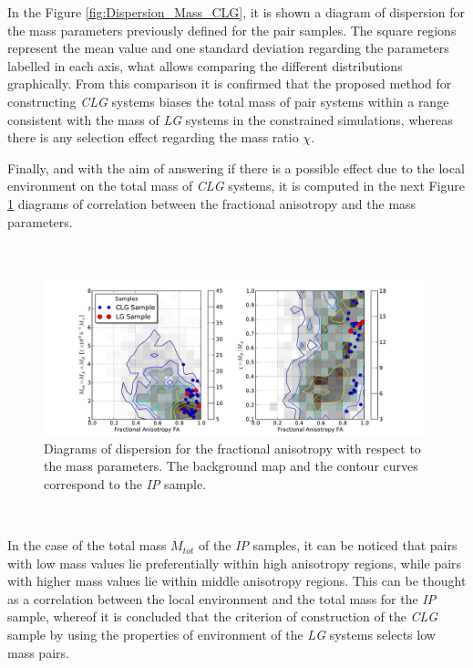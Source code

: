 In the Figure \ref{fig:Dispersion_Mass_CLG}, it is shown a diagram of 
dispersion for the mass parameters previously defined for the pair samples.
The square regions represent the mean value and one standard deviation 
regarding the parameters labelled in each axis, what allows comparing the
different distributions graphically. From this comparison it is confirmed 
that the proposed method for constructing \textit{CLG} systems biases the 
total mass of pair systems within a range consistent with the mass of 
\textit{LG} systems in the constrained simulations, whereas there is any
selection effect regarding the mass ratio $\chi$.


Finally, and with the aim of answering if there is a possible effect due
to the local environment on the total mass of \textit{CLG} systems, it is
computed in the next Figure \ref{fig:CLG_FA_Mass} diagrams of correlation
between the fractional anisotropy and the mass parameters.


\
\begin{figure}[htbp]
	\centering
	\includegraphics[trim = 25mm 0mm 35mm 10mm, clip, width=1.0\textwidth]
	{./figures/4_results/CLG_FA_Mass.pdf}
	
	\caption{\small{Diagrams of dispersion for the fractional anisotropy
	with respect to the mass parameters. The background map and the contour
	curves correspond to the \textit{IP} sample.}}
	\label{fig:CLG_FA_Mass}
\end{figure}
\

In the case of the total mass $M_{tot}$ of the \textit{IP} samples, it can
be noticed that pairs with low mass values lie preferentially within high
anisotropy regions, while pairs with higher mass values lie within middle
anisotropy regions. This can be thought as a correlation between the local
environment and the total mass for the \textit{IP} sample, whereof it is 
concluded that the criterion of construction of the \textit{CLG} sample
by using the properties of environment of the \textit{LG} systems selects
low mass pairs.


